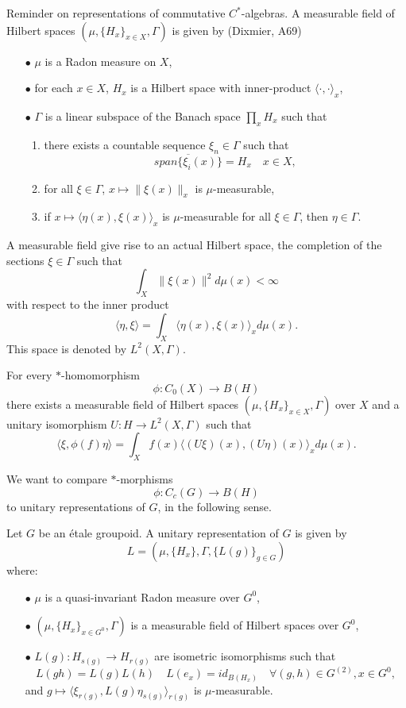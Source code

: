 Reminder on representations of commutative $C^*$-algebras. A measurable field of Hilbert spaces $(\mu, \{H_x\}_{x\in X},\Gamma) $ is given by (Dixmier, A69) 
\begin{itemize}
\item[$\bullet$] $\mu$ is a Radon measure on $X$,
\item[$\bullet$] for each $x\in X$, $H_x$ is a Hilbert space with inner-product $\langle \cdot , \cdot \rangle_x $,
\item[$\bullet$] $\Gamma $ is a linear subspace of the Banach space $\prod_x H_x$ such that 
\begin{enumerate}
\item there exists a countable sequence $\xi_n \in \Gamma$ such that 
\[\overline{span \{\xi_i(x)\}} = H_x \quad x\in X,\]
\item for all $\xi \in \Gamma$, $x \mapsto \|\xi(x)\|_x$ is $\mu$-measurable,
\item if $x\mapsto \langle \eta(x), \xi(x)\rangle_x$ is $\mu$-measurable for all $\xi \in \Gamma$, then $\eta\in \Gamma$. 
\end{enumerate}
\end{itemize}
A measurable field give rise to an actual Hilbert space, the completion of the sections $\xi \in \Gamma$ such that 
\[ \int_X \|\xi(x)\|^2 d\mu(x)<\infty\]
with respect to the inner product 
\[\langle \eta , \xi\rangle = \int_X \langle \eta(x), \xi(x)\rangle_xd\mu(x).\]
This space is denoted by $L^2(X,\Gamma)$.	
\begin{prop}
For every $*$-homomorphism
\[\phi : C_0(X) \rightarrow B(H)\]
there exists a measurable field of Hilbert spaces $(\mu, \{H_x\}_{x\in X},\Gamma) $ over $X$ and a unitary isomorphism $U: H \rightarrow L^2(X,\Gamma)$ such that 
\[\langle \xi ,\phi(f) \eta \rangle = \int_X f(x)\langle (U\xi )(x) ,(U\eta)(x) \rangle_x d\mu(x).\]
\end{prop}

We want to compare $*$-morphisms 
\[\phi : C_c(G) \rightarrow B(H)\]
to unitary representations of $G$, in the following sense.

\begin{definition} Let $G$ be an \'etale groupoid. A unitary representation of $G$ is given by 
\[ L=(\mu, \{H_x\},\Gamma, \{L(g)\}_{g\in G}) \]
where:
\begin{itemize}
\item[$\bullet$] $\mu$ is a quasi-invariant Radon measure over $G^0$,
\item[$\bullet$] $(\mu, \{H_x\}_{x\in G^0},\Gamma) $ is a measurable field of Hilbert spaces over $G^0$,
\item[$\bullet$] $L(g) : H_{s(g)} \rightarrow H_{r(g)}$ are isometric isomorphisms such that
\[L(gh)= L(g)L(h) \quad L(e_x)=id_{B(H_x)}\quad \forall (g,h)\in G^{(2)}, x\in G^0,\]
and $g\mapsto \langle \xi_{r(g)} ,L(g) \eta_{s(g)} \rangle_{r(g)}$ is $\mu$-measurable.
\end{itemize}
\end{definition}

